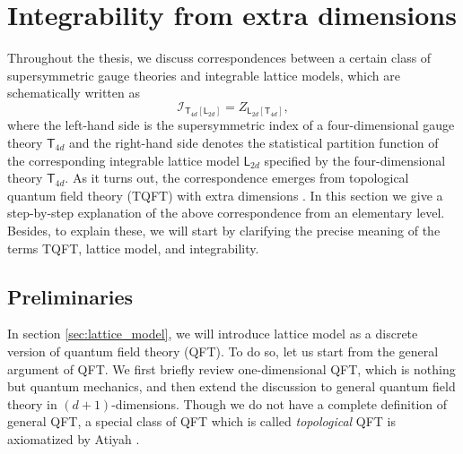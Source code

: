 \begin{comment}
\documentclass[11pt]{article}  %
\usepackage{Common/toshi}

\end{comment}


\section{Integrability from extra dimensions}
\label{sec:integrability}


Throughout the thesis, we discuss correspondences between
a certain class of supersymmetric gauge theories and integrable lattice
models, which are schematically written as
\begin{equation}
  \mathcal{I}_{\mathsf{T}_{4d}\left[\mathsf{L}_{2d}\right]}
    =  Z_{\mathsf{L}_{2d}\left[\mathsf{T}_{4d}\right]},
  \label{eq:correspondence}
\end{equation}
where the left-hand side is the supersymmetric index of a four-dimensional
gauge theory $\mathsf{T}_{4d}$ and the right-hand side denotes the
statistical partition function of the corresponding integrable lattice
model $\mathsf{L}_{2d}$ specified by the four-dimensional theory
$\mathsf{T}_{4d}$. As it turns out, the correspondence emerges from
topological quantum field theory (TQFT) with extra dimensions \cite{Yagi:2015lha}.
In this section
we give a step-by-step explanation of the above correspondence from
an elementary level. Besides, to explain these, we will start by clarifying
the precise meaning of the terms TQFT, lattice model, and integrability.





\subsection{Preliminaries}
\label{sec:preliminaries}

In section \ref{sec:lattice_model}, we will introduce lattice model as
a discrete version of quantum field theory (QFT).
To do so, let us start from the general
argument of QFT. We first briefly review one-dimensional QFT, which
is nothing but quantum mechanics, and then extend the discussion to
general quantum field theory in $(d+1)$-dimensions. Though we do
not have a complete definition of general QFT, a special class of
QFT which is called \emph{topological} QFT is axiomatized by Atiyah
\cite{Atiyah:1989vu}.





